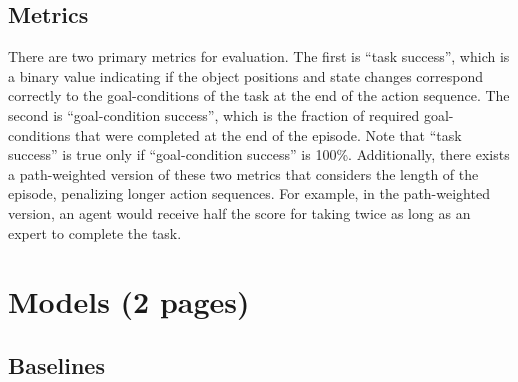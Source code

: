 \documentclass[11pt,a4paper]{article}
\begin{document}
\subsection{Metrics}
There are two primary metrics for evaluation. The first is ``task success'', which is a binary value indicating if the object positions and state changes correspond correctly to the goal-conditions of the task at the end of the action sequence. The second is ``goal-condition success'', which is the fraction of required goal-conditions that were completed at the end of the episode. Note that ``task success'' is true only if ``goal-condition success'' is 100\%. Additionally, there exists a path-weighted version of these two metrics that considers the length of the episode, penalizing longer action sequences. For example, in the path-weighted version, an agent would receive half the score for taking twice as long as an expert to complete the task.

\clearpage
\clearpage
\section{Models (2 pages)}

\subsection{Baselines}
\end{document}
